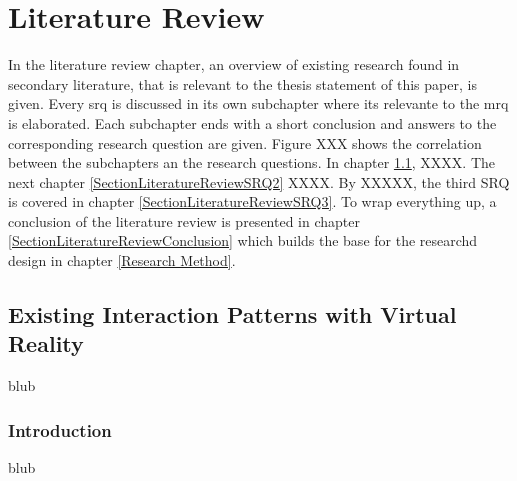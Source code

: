 
\chapter{Literature Review} %

\label{ChapterLiteratureReview} %

In the literature review chapter, an overview of existing research found in secondary literature, that is relevant to the thesis statement of this paper, is given. Every \gls{srq} is discussed in its own subchapter where its relevante to the \gls{mrq} is elaborated. Each subchapter ends with a short conclusion and answers to the corresponding research question are given.
Figure XXX shows the correlation between the subchapters an the research questions. In chapter \ref{SectionLiteratureReviewSRQ1}, XXXX. The next chapter \ref{SectionLiteratureReviewSRQ2} XXXX. By XXXXX, the third SRQ is covered in chapter \ref{SectionLiteratureReviewSRQ3}. To wrap everything up, a conclusion of the literature review is presented in chapter \ref{SectionLiteratureReviewConclusion} which builds the base for the researchd design in chapter \ref{Research Method}.




\section{Existing Interaction Patterns with Virtual Reality}

\label{SectionLiteratureReviewSRQ1}

blub


\subsection{Introduction}

blub



